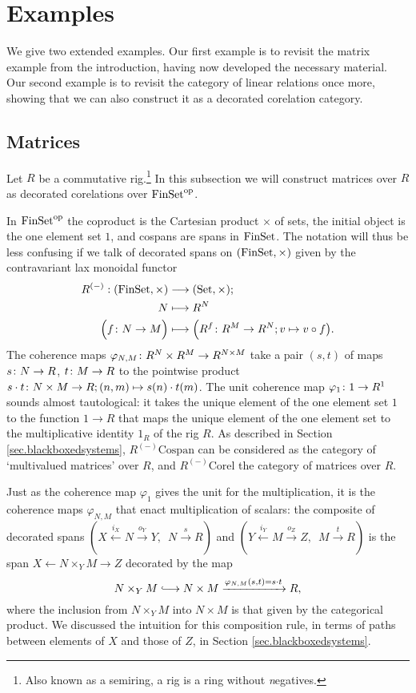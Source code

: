 \section{Examples} \label{sec:excor}
We give two extended examples. Our first example is to revisit the matrix
example from the introduction, having now developed the necessary material. Our
second example is to revisit the category of linear relations once more, showing
that we can also construct it as a decorated corelation category. 

\subsection{Matrices} \label{ssec.matrices}

Let $R$ be a commutative rig.\footnote{Also known as a semiring, a rig is a ring
  without \emph{n}egatives.} In this subsection we will
construct matrices over $R$ as decorated corelations over $\mathrm{FinSet}^{\mathrm{op}}$. 

In $\mathrm{FinSet}^{\mathrm{op}}$ the coproduct is the Cartesian product $\times$ of sets, the
initial object is the one element set $1$, and cospans are spans in $\mathrm{FinSet}$.
The notation will thus be less confusing if we talk of decorated spans on
$(\mathrm{FinSet},\times)$ given by the contravariant lax monoidal functor
\begin{align*}
  R^{(-)}: (\mathrm{FinSet},\times) &\longrightarrow (\mathrm{Set},\times); \\
  N &\longmapsto R^N \\
  \Big(f{\colon} N \to M\Big) &\longmapsto \Big(R^f{\colon} R^M \to R^N; v \mapsto v \circ
  f\big).
\end{align*}
The coherence maps $\varphi_{N,M}{\colon} R^N \times R^M \to R^{N\times M}$ take a
pair $(s,t)$ of maps $s{\colon} N \to R$, $t{\colon} M \to R$ to the pointwise product
$s\cdot t {\colon} N\times M \to R; (n,m) \mapsto s(n) \cdot t(m)$. The unit
coherence map $\varphi_1{\colon} 1 \to R^1$ sounds almost tautological: it takes
the unique element of the one element set $1$ to the function $1 \to R$ that
maps the unique element of the one element set to the multiplicative identity
$1_R$ of the rig $R$.  As described in Section \ref{sec.blackboxedsystems},
$R^{(-)}\mathrm{Cospan}$ can be considered as the category of `multivalued
matrices' over $R$, and $R^{(-)}\mathrm{Corel}$ the category of matrices over
$R$.

Just as the coherence map $\varphi_1$ gives the unit for the multiplication, it
is the coherence maps $\varphi_{N,M}$ that enact multiplication of scalars:
the composite of decorated spans $(X \xleftarrow{i_X} N \xrightarrow{o_Y} Y,\enspace N
\xrightarrow{s} R)$ and $(Y \xleftarrow{i_Y} M \xrightarrow{o_Z} Z,\enspace M
\xrightarrow{t} R)$ is the span $X \leftarrow N\times_YM \rightarrow Z$ decorated
by the map
\[
  N \times_YM \hooklongrightarrow N \times M \xrightarrow{\varphi_{N,M}(s,t) = s \cdot t}
  R,
\]
where the inclusion from $N \times_YM$ into $N \times M$ is that given by the
categorical product. We discussed the intuition for this composition rule, in
terms of paths between elements of $X$ and those of $Z$, in Section
\ref{sec.blackboxedsystems}. 

